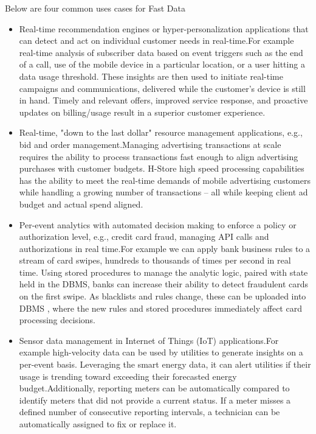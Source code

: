 \documentclass[9pt,twocolumn,twoside]{styles/osajnl}
\begin{document}
Below are four common uses cases for Fast Data 
\begin{itemize}
\renewcommand{\labelitemi}{\scriptsize$\bullet$} 
\item Real-time recommendation engines or hyper-personalization applications that can detect and act on individual customer needs in real-time.For example real-time analysis of subscriber data based on event triggers such as the end of a call, use of the mobile device in a particular location, or a user hitting a data usage threshold. These insights are then used to initiate real-time campaigns and communications, delivered while the customer’s device is still in hand. Timely and relevant offers, improved service response, and proactive updates on billing/usage result in a superior customer experience.
\item Real-time, "down to the last dollar" resource management applications, e.g., bid and order management.Managing advertising transactions at scale requires the ability to process transactions fast enough to align advertising purchases with customer budgets. H-Store high speed processing capabilities has the ability to meet the real-time demands of mobile advertising customers while handling a growing number of transactions – all while keeping client ad budget and actual spend aligned.
\item Per-event analytics with automated decision making to enforce a policy or authorization level, e.g., credit card fraud, managing API calls and authorizations in real time.For example we can apply bank business rules to a stream of card swipes, hundreds to thousands of times per second in real time. Using stored procedures to manage the analytic logic, paired with state held in the DBMS, banks can increase their ability to detect fraudulent cards on the first swipe. As blacklists and rules change, these can be uploaded into DBMS , where the new rules and stored procedures immediately affect card processing decisions.
\item Sensor data management in Internet of Things (IoT) applications.For example high-velocity data can be used by utilities to generate insights on a per-event basis. Leveraging the smart energy data, it can alert utilities if their usage is trending toward exceeding their forecasted energy budget.Additionally, reporting meters can be automatically compared to identify meters that did not provide a current status. If a meter misses a defined number of consecutive reporting intervals, a technician can be automatically assigned to fix or replace it.
\end{itemize}
\end{document}
